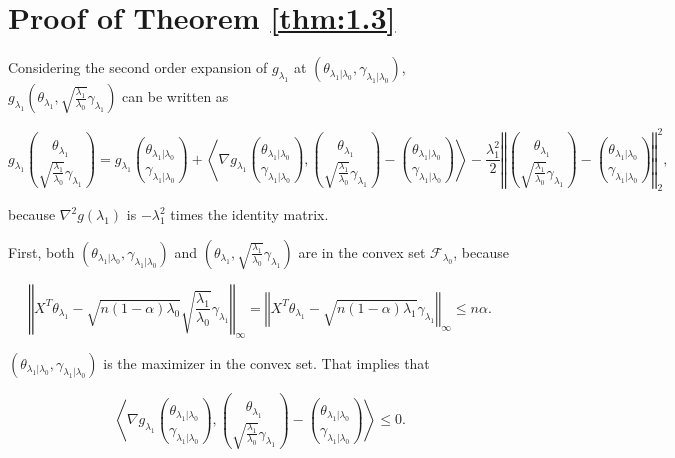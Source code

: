 \section{Proof of Theorem \ref{thm:1.3}}

Considering the second order expansion of $g_{\lambda_1}$ at $(\theta_{\lambda_1|\lambda_0},\gamma_{\lambda_1|\lambda_0})$, $g_{\lambda_1}\left(\theta_{\lambda_1},\sqrt{\frac{\lambda_1}{\lambda_0}}\gamma_{\lambda_1}\right)$ can be written as

\begin{equation}
    \label{eq:1.3.1}
    g_{\lambda_1}\binom{\theta_{\lambda_1}}{\sqrt{\frac{\lambda_1}{\lambda_0}}\gamma_{\lambda_1}}=g_{\lambda_1}\binom{\theta_{\lambda_1|\lambda_0}}{\gamma_{\lambda_1|\lambda_0}}+\left\langle\nabla g_{\lambda_1}\binom{\theta_{\lambda_1|\lambda_0}}{\gamma_{\lambda_1|\lambda_0}},\binom{\theta_{\lambda_1}}{\sqrt{\frac{\lambda_1}{\lambda_0}}\gamma_{\lambda_1}}-\binom{\theta_{\lambda_1|\lambda_0}}{\gamma_{\lambda_1|\lambda_0}}\right\rangle-\frac{\lambda_1^2}{2}\left\Vert\binom{\theta_{\lambda_1}}{\sqrt{\frac{\lambda_1}{\lambda_0}}\gamma_{\lambda_1}}-\binom{\theta_{\lambda_1|\lambda_0}}{\gamma_{\lambda_1|\lambda_0}}\right\Vert_2^2,
\end{equation}

because $\nabla^2g(\lambda_1)$ is $-\lambda_1^2$ times the identity matrix. 

First, both $(\theta_{\lambda_1|\lambda_0},\gamma_{\lambda_1|\lambda_0})$ and $\left(\theta_{\lambda_1},\sqrt{\frac{\lambda_1}{\lambda_0}}\gamma_{\lambda_1}\right)$ are in the convex set $\mathcal{F}_{\lambda_0}$, because

\begin{equation}
    \left\Vert X^T\theta_{\lambda_1}-\sqrt{n(1-\alpha)\lambda_0}\sqrt{\frac{\lambda_1}{\lambda_0}}\gamma_{\lambda_1}\right\Vert_\infty= \left\Vert X^T\theta_{\lambda_1}-\sqrt{n(1-\alpha)\lambda_1}\gamma_{\lambda_1}\right\Vert_\infty\leq n\alpha.
\end{equation}

$(\theta_{\lambda_1|\lambda_0},\gamma_{\lambda_1|\lambda_0})$ is the maximizer in the convex set. That implies that

\begin{equation}
    \label{eq:1.3.2}
    \left\langle\nabla g_{\lambda_1}\binom{\theta_{\lambda_1|\lambda_0}}{\gamma_{\lambda_1|\lambda_0}},\binom{\theta_{\lambda_1}}{\sqrt{\frac{\lambda_1}{\lambda_0}}\gamma_{\lambda_1}}-\binom{\theta_{\lambda_1|\lambda_0}}{\gamma_{\lambda_1|\lambda_0}}\right\rangle\leq 0.
\end{equation}


